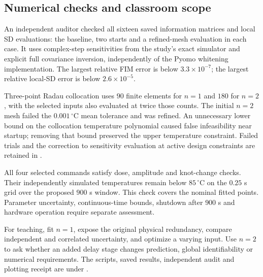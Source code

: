 \documentclass[11pt]{article}
\begin{document}

\FloatBarrier

\subsection{Numerical checks and classroom scope}
An independent auditor checked all sixteen saved information matrices and local
SD evaluations: the baseline, two starts and a refined-mesh evaluation in each
case. It uses complex-step sensitivities from the study's exact simulator and
explicit full covariance inversion, independently of the Pyomo whitening
implementation. The largest relative FIM error is below $3.3\times10^{-7}$;
the largest relative local-SD error is below $2.6\times10^{-5}$.

Three-point Radau collocation uses $90$ finite elements for $n=1$ and $180$
for $n=2$, with the selected inputs also evaluated at twice those counts.
The initial $n=2$ mesh failed the $0.001\,{}^\circ\mathrm C$ mean tolerance
and was refined. An unnecessary lower bound on the collocation temperature
polynomial caused false infeasibility near startup; removing that bound
preserved the upper temperature constraint. Failed trials and the correction
to sensitivity evaluation at active design constraints are retained in
.

All four selected commands satisfy dose, amplitude and knot-change checks.
Their independently simulated temperatures remain below $85\,{}^\circ\mathrm C$
on the $0.25$ s grid over the proposed $900$ s window. This check covers the
nominal fitted points. Parameter uncertainty, continuous-time bounds, shutdown
after $900$ s and hardware operation require separate assessment.

For teaching, fit $n=1$, expose the original physical redundancy, compare
independent and correlated uncertainty, and optimize a varying input.
Use $n=2$ to ask whether an added delay stage changes prediction, global
identifiability or numerical requirements. The scripts, saved results,
independent audit and plotting receipt are under
.

\end{document}
